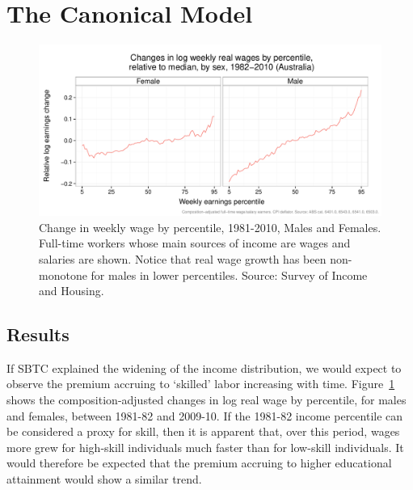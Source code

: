 \section{The Canonical Model}

\begin{figure}
  \centering
  \includegraphics[width=\textwidth]{../figure/quantile_mf.pdf}
  \caption{Change in weekly wage by percentile, 1981-2010, Males and Females. Full-time workers whose main sources of income are wages and salaries are shown. Notice that real wage growth has been non-monotone for males in lower percentiles. Source: Survey of Income and Housing.}
  \label{fig:banana}
\end{figure}

\subsection{Results}

If SBTC explained the widening of the income distribution, we would expect to observe the premium accruing to `skilled' labor increasing with time. Figure~\ref{fig:banana} shows the composition-adjusted changes in log real wage by percentile, for males and females, between 1981-82 and 2009-10. If the 1981-82 income percentile can be considered a proxy for skill, then it is apparent that, over this period, wages more grew for high-skill individuals much faster than for low-skill individuals. It would therefore be expected that the premium accruing to higher educational attainment would show a similar trend.


